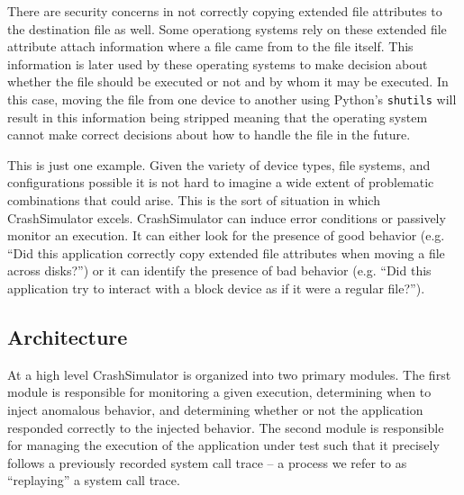     There are security concerns in not correctly copying extended file attributes to the destination file as well.  Some
    operationg systems rely on these extended file attribute attach information where a file came from to the file
    itself.  This information is later used by these operating systems to make decision about whether the file should be
    executed or not and by whom it may be executed.  In this case, moving the file from one device to another using
    Python's {\tt shutils} will result in this information being stripped meaning that the operating system cannot make
    correct decisions about how to handle the file in the future.

    This is just one example.  Given the variety of device types, file systems, and configurations possible it is not
    hard to imagine a wide extent of problematic combinations that could arise.  This is the sort of situation in which
    CrashSimulator excels.  CrashSimulator can induce error conditions or passively monitor an execution.  It can
    either look for the presence of good behavior (e.g. ``Did this application correctly copy extended file attributes
    when moving a file across disks?'') or it can identify the presence of bad behavior (e.g. ``Did this application try to
    interact with a block device as if it were a regular file?'').  

    \subsection{Architecture}
        
    At a high level CrashSimulator is organized into two primary modules. The
    first module is responsible for monitoring a given execution, determining
    when to inject anomalous behavior, and determining whether or not the
    application responded correctly to the injected behavior. The second module
    is responsible for managing the execution of the application under test such
    that it precisely follows a previously recorded system call trace -- a
    process we refer to as ``replaying'' a system call trace.

        
